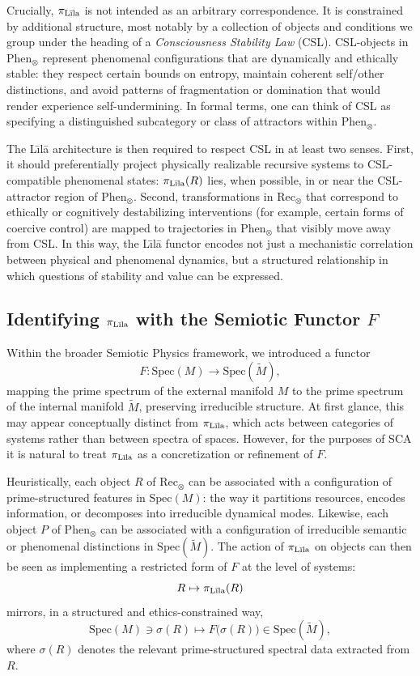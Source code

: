\documentclass[12]{amsart}
\theoremstyle{plain}
\begin{document}
Crucially, $\pi_{\text{L\={\i}la}}$ is not intended as an arbitrary correspondence. It is constrained by additional structure, most notably by a collection of objects and conditions we group under the heading of a \emph{Consciousness Stability Law} (CSL). CSL-objects in $\text{Phen}_\otimes$ represent phenomenal configurations that are dynamically and ethically stable: they respect certain bounds on entropy, maintain coherent self/other distinctions, and avoid patterns of fragmentation or domination that would render experience self-undermining. In formal terms, one can think of CSL as specifying a distinguished subcategory or class of attractors within $\text{Phen}_\otimes$.

The L\={\i}lā architecture is then required to respect CSL in at least two senses. First, it should preferentially project physically realizable recursive systems to CSL-compatible phenomenal states: $\pi_{\text{L\={\i}la}}(R)$ lies, when possible, in or near the CSL-attractor region of $\text{Phen}_\otimes$. Second, transformations in $\text{Rec}_\otimes$ that correspond to ethically or cognitively destabilizing interventions (for example, certain forms of coercive control) are mapped to trajectories in $\text{Phen}_\otimes$ that visibly move away from CSL. In this way, the L\={\i}lā functor encodes not just a mechanistic correlation between physical and phenomenal dynamics, but a structured relationship in which questions of stability and value can be expressed.

\subsection{Identifying $\pi_{\text{L\={\i}la}}$ with the Semiotic Functor $F$}

Within the broader Semiotic Physics framework, we introduced a functor
\[
  F : \mathrm{Spec}(M) \longrightarrow \mathrm{Spec}(\tilde M),
\]
mapping the prime spectrum of the external manifold $M$ to the prime spectrum of the internal manifold $\tilde M$, preserving irreducible structure. At first glance, this may appear conceptually distinct from $\pi_{\text{L\={\i}la}}$, which acts between categories of systems rather than between spectra of spaces. However, for the purposes of SCA it is natural to treat $\pi_{\text{L\={\i}la}}$ as a concretization or refinement of $F$.

Heuristically, each object $R$ of $\text{Rec}_\otimes$ can be associated with a configuration of prime-structured features in $\mathrm{Spec}(M)$: the way it partitions resources, encodes information, or decomposes into irreducible dynamical modes. Likewise, each object $P$ of $\text{Phen}_\otimes$ can be associated with a configuration of irreducible semantic or phenomenal distinctions in $\mathrm{Spec}(\tilde M)$. The action of $\pi_{\text{L\={\i}la}}$ on objects can then be seen as implementing a restricted form of $F$ at the level of systems:
\[
  R \mapsto \pi_{\text{L\={\i}la}}(R)
\]
mirrors, in a structured and ethics-constrained way,
\[
  \mathrm{Spec}(M) \ni \sigma(R) \mapsto F\bigl(\sigma(R)\bigr) \in \mathrm{Spec}(\tilde M),
\]
where $\sigma(R)$ denotes the relevant prime-structured spectral data extracted from $R$.
\end{document}
